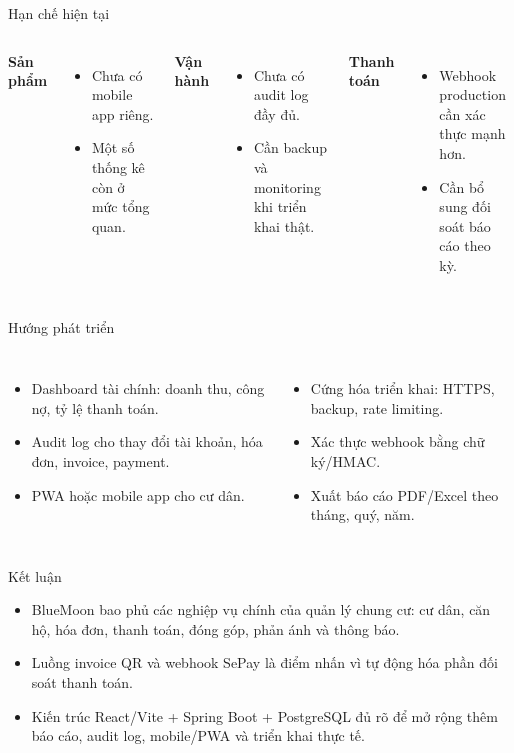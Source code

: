 \documentclass[t, aspectratio=169]{beamer}
\begin{document}
\begin{frame}{Hạn chế hiện tại}
\begin{columns}[T,onlytextwidth]
\textbf{\textcolor{hustprimary}{Sản phẩm}}
\begin{itemize}
  \item Chưa có mobile app riêng.
  \item Một số thống kê còn ở mức tổng quan.
\end{itemize}
\textbf{\textcolor{hustprimary}{Vận hành}}
\begin{itemize}
  \item Chưa có audit log đầy đủ.
  \item Cần backup và monitoring khi triển khai thật.
\end{itemize}
\textbf{\textcolor{hustprimary}{Thanh toán}}
\begin{itemize}
  \item Webhook production cần xác thực mạnh hơn.
  \item Cần bổ sung đối soát báo cáo theo kỳ.
\end{itemize}
\end{columns}
\end{frame}

\begin{frame}{Hướng phát triển}
\begin{columns}[T,onlytextwidth]
\begin{itemize}
  \item Dashboard tài chính: doanh thu, công nợ, tỷ lệ thanh toán.
  \item Audit log cho thay đổi tài khoản, hóa đơn, invoice, payment.
  \item PWA hoặc mobile app cho cư dân.
\end{itemize}
\begin{itemize}
  \item Cứng hóa triển khai: HTTPS, backup, rate limiting.
  \item Xác thực webhook bằng chữ ký/HMAC.
  \item Xuất báo cáo PDF/Excel theo tháng, quý, năm.
\end{itemize}
\end{columns}
\end{frame}

\begin{frame}{Kết luận}
\begin{itemize}
  \item BlueMoon bao phủ các nghiệp vụ chính của quản lý chung cư: cư dân, căn hộ, hóa đơn, thanh toán, đóng góp, phản ánh và thông báo.
  \item Luồng invoice QR và webhook SePay là điểm nhấn vì tự động hóa phần đối soát thanh toán.
  \item Kiến trúc React/Vite + Spring Boot + PostgreSQL đủ rõ để mở rộng thêm báo cáo, audit log, mobile/PWA và triển khai thực tế.
\end{itemize}

\end{frame}

\hustthankyou
\end{document}
